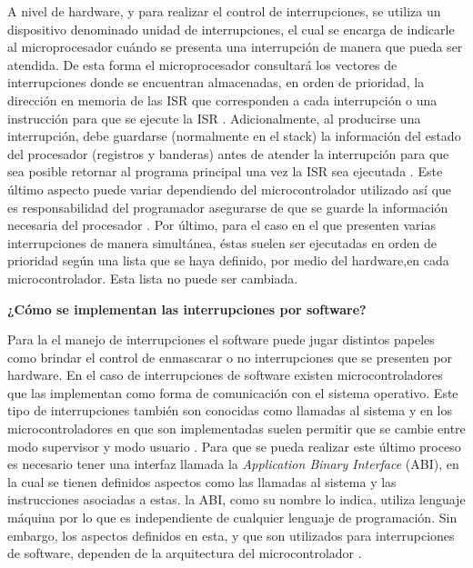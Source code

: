 \documentclass[a4paper,11pt]{article}
\begin{document}
A nivel de hardware, y para realizar el control de interrupciones, se utiliza un dispositivo denominado unidad de interrupciones, el cual se encarga de indicarle al microprocesador cuándo se presenta una interrupción de manera que pueda ser atendida.
De esta forma el microprocesador consultará los vectores de interrupciones donde se encuentran almacenadas, en orden de prioridad, la dirección en memoria de las ISR que corresponden a cada interrupción o una instrucción para que se ejecute la ISR \cite[p.9]{susnea2005microcontrollers}. Adicionalmente, al producirse una interrupción, debe guardarse (normalmente en el stack) la información del estado del procesador (registros y banderas) antes de atender la interrupción para que sea posible retornar al programa principal una vez la ISR sea ejecutada \cite[p.4]{reyes2015arduino}. Este último aspecto puede variar dependiendo del microcontrolador utilizado así que es responsabilidad del programador asegurarse de que se guarde la información necesaria del procesador \cite[p.10]{susnea2005microcontrollers}.
Por último, para el caso en el que presenten varias interrupciones de manera simultánea, éstas suelen ser ejecutadas en orden de prioridad según una lista que se haya definido, por medio del hardware,en cada microcontrolador. Esta lista no puede ser cambiada.

{\large\bfseries ¿Cómo se implementan las interrupciones por software?  } 

Para la el manejo de interrupciones el software puede jugar distintos papeles como brindar el control de  enmascarar o no interrupciones que se presenten por hardware.
En el caso de interrupciones de software existen microcontroladores que las implementan como forma de comunicación con el sistema operativo. Este tipo de interrupciones también son conocidas como llamadas al sistema y en los microcontroladores en que son implementadas suelen permitir que se cambie entre modo supervisor y modo usuario \cite[p.236]{rafiquzzaman1995microprocessors}.
Para que se pueda realizar este último proceso es necesario tener una interfaz llamada la \emph{Application Binary Interface }(ABI), en la cual se tienen definidos aspectos como las llamadas al sistema y las instrucciones asociadas a estas. la ABI, como su nombre lo indica, utiliza lenguaje máquina por lo que es independiente de cualquier lenguaje de programación. Sin embargo, los aspectos definidos en esta, y que son utilizados para interrupciones de software, dependen de la arquitectura del microcontrolador \cite[p.24]{ecker2009hardware}.
\end{document}
